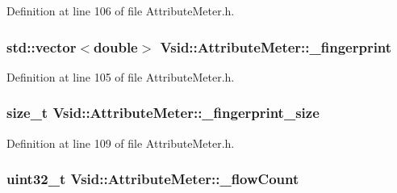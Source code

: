 Definition at line 106 of file Attribute\-Meter.\-h.

\hypertarget{class_vsid_1_1_attribute_meter_a0386b2fe9c5d6ab6fba16029d8da4efe}{
\subsubsection[{\-\_\-fingerprint}]{\setlength{\rightskip}{0pt plus 5cm}std\-::vector$<$double$>$ Vsid\-::\-Attribute\-Meter\-::\-\_\-fingerprint\hspace{0.3cm}{\ttfamily [protected]}}}\label{class_vsid_1_1_attribute_meter_a0386b2fe9c5d6ab6fba16029d8da4efe}


Definition at line 105 of file Attribute\-Meter.\-h.

\hypertarget{class_vsid_1_1_attribute_meter_a95396692ad5dd58a6e7460d8eaa9a9ec}{
\subsubsection[{\-\_\-fingerprint\-\_\-size}]{\setlength{\rightskip}{0pt plus 5cm}size\-\_\-t Vsid\-::\-Attribute\-Meter\-::\-\_\-fingerprint\-\_\-size\hspace{0.3cm}{\ttfamily [protected]}}}\label{class_vsid_1_1_attribute_meter_a95396692ad5dd58a6e7460d8eaa9a9ec}


Definition at line 109 of file Attribute\-Meter.\-h.

\hypertarget{class_vsid_1_1_attribute_meter_aaa51ca831d84c6b76728ca9aa295fd98}{
\subsubsection[{\-\_\-flow\-Count}]{\setlength{\rightskip}{0pt plus 5cm}uint32\-\_\-t Vsid\-::\-Attribute\-Meter\-::\-\_\-flow\-Count\hspace{0.3cm}{\ttfamily [protected]}}}\label{class_vsid_1_1_attribute_meter_aaa51ca831d84c6b76728ca9aa295fd98}


